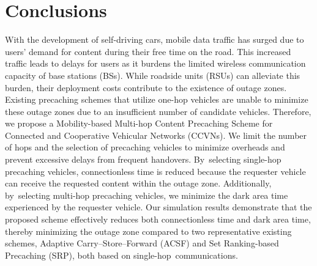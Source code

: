 \documentclass[electronics,aricle,accept,pdftex,moreauthors]{Definitions/mdpi}
\begin{document}
\section{Conclusions} \label{sec5}
With the development of self-driving cars, mobile data traffic has surged due to users' demand for content during their free time on the road. This increased traffic leads to delays for users as it burdens the limited wireless communication capacity of base stations (BSs). While roadside units (RSUs) can alleviate this burden, their deployment costs contribute to the existence of outage zones. Existing precaching schemes that utilize one-hop vehicles are unable to minimize these outage zones due to an insufficient number of candidate vehicles. Therefore, we propose a Mobility-based Multi-hop Content Precaching Scheme for Connected and Cooperative Vehicular Networks (CCVNs). We limit the number of hops and the selection of precaching vehicles to minimize overheads and prevent excessive delays from frequent handovers. By~selecting single-hop precaching vehicles, connectionless time is reduced because the requester vehicle can receive the requested content within the outage zone. Additionally, by~selecting multi-hop precaching vehicles, we minimize the dark area time experienced by the requester vehicle. Our simulation results demonstrate that the proposed scheme effectively reduces both connectionless time and dark area time, thereby minimizing the outage zone compared to two representative existing schemes, Adaptive Carry--Store--Forward (ACSF) and Set Ranking-based Precaching (SRP), both based on single-hop~communications.


\vspace{6pt}

\end{document}

